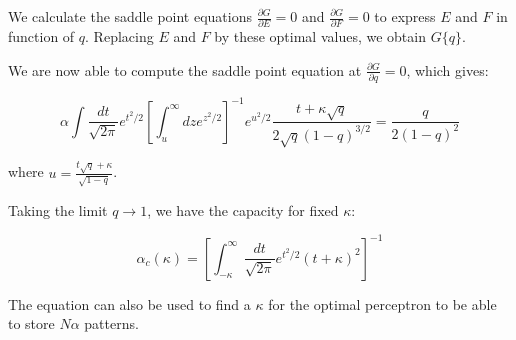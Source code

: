 We calculate the saddle point equations $\frac{\partial G}{\partial E} = 0$ and $\frac{\partial G}{\partial F} = 0$ to express $E$ and $F$ in function of $q$. Replacing $E$ and $F$ by these optimal values, we obtain $G \{ q \}$.

We are now able to compute the saddle point equation at $\frac{\partial G}{\partial q} = 0$, which gives:

\begin{equation}
    \alpha \int \frac{dt}{\sqrt{2 \pi}} e^{t^2 / 2} \left[ \int_u^\infty dz e^{z^2 / 2} \right] ^{-1} e^{u^2 / 2} \frac{t + \kappa \sqrt{q}}{2 \sqrt{q} (1 - q)^{3/2}} = \frac{q}{2 (1 - q)^2}
\end{equation}

\noindent where $u = \frac{t \sqrt{q} + \kappa}{\sqrt{1 - q}}$.

Taking the limit $q \longrightarrow 1$, we have the capacity for fixed $\kappa$:

\begin{equation}
    \alpha_c (\kappa) = \left[ \int_{-\kappa}^\infty \frac{dt}{\sqrt{2 \pi}} e^{t^2 / 2} (t + \kappa)^2 \right] ^{-1}
\end{equation}

The equation can also be used to find a $\kappa$ for the optimal perceptron to be able to store $N \alpha$ patterns.